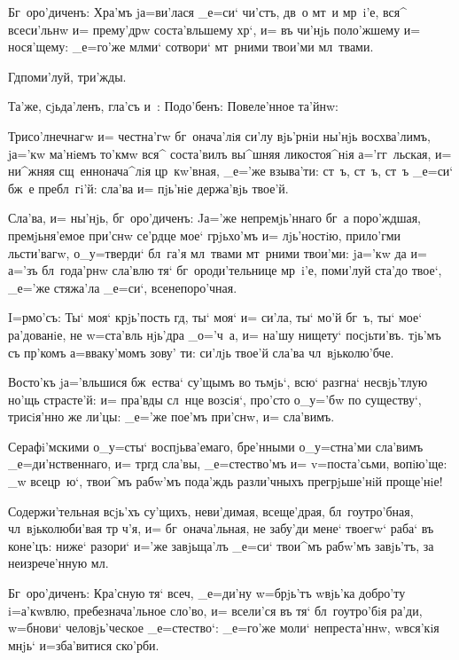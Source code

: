 Бг~оро'диченъ: Хра'мъ jа=ви'лася _е=си` чи'стъ, дв~о 
мт~и мр~i'е, вся^ всеси'льнw и= прему'дрw соста'вльшему 
хр`, и= въ чи'нjь поло'жшему и= нося'щему: _е=го'же 
мл ми` сотвори` мт~рними твои'ми мл~твами.

Гд поми'луй, три'жды.

Та'же, сjьда'ленъ, гла'съ и~: Подо'бенъ: Повеле'нное 
та'йнw:

Трисо'лнечнагw и= честна'гw бг~онача'лiя си'лу 
вjь'рнiи ны'нjь восхва'лимъ, jа='кw ма'нiемъ то'кмw вся^ 
соста'вилъ вы^шняя ликостоя^нiя а='гг~льская, и= ни^жняя 
сщ~еннонача^лiя цр~кw'вная, _е='же взыва'ти: ст~ъ, ст~ъ, 
ст~ъ _е=си` бж~е пребл~гi'й: сла'ва и= пjь'нiе держа'вjь 
твое'й.

Сла'ва, и= ны'нjь, бг~оро'диченъ: Jа='же 
непремjь'ннаго бг~а поро'ждшая, премjьня'емое при'снw 
се'рдце мое` грjьхо'мъ и= лjь'ностiю, прило'гми 
льсти'вагw, о_у=тверди` бл~га'я мл~твами мт~рними 
твои'ми: jа='кw да и= а='зъ бл~года'рнw сла'влю тя` 
бг~ороди'тельнице мр~i'е, поми'луй ста'до твое`, _е='же 
стяжа'ла _е=си`, всенепоро'чная.


I=рмо'съ: Ты` моя` крjь'пость гд, ты` моя` и= 
си'ла, ты` мо'й бг~ъ, ты` мое` ра'дованiе, не w=ста'вль 
нjь'дра _о='ч~а, и= на'шу нищету` посjьти'въ. тjь'мъ съ 
пр'комъ а=вваку'момъ зову' ти: си'лjь твое'й сла'ва 
чл~вjьколю'бче.

Восто'къ jа='вльшися бж~ества` су'щымъ во тьмjь`, всю` 
разгна` несвjь'тлую но'щь страсте'й: и= пра'вды сл~нце 
возсiя`, про'сто о_у='бw по существу`, трисiя'нно же 
ли'цы: _е='же пое'мъ при'снw, и= сла'вимъ.

Серафi'мскими о_у=сты` воспjьва'емаго, бре'нными 
о_у=стна'ми сла'вимъ _е=ди'нственнаго, и= тр гд 
сла'вы, _е=стество'мъ и= v=поста'сьми, вопiю'ще: _w 
всецр~ю`, твои^мъ рабw'мъ пода'ждь разли'чныхъ 
прегрjьше'нiй проще'нiе!

Содержи'тельная всjь'хъ су'щихъ, неви'димая, 
всеще'драя, бл~гоутро'бная, чл~вjьколюби'вая тр 
ч'я, и= бг~онача'льная, не забу'ди мене` твоегw` 
раба` въ коне'цъ: ниже` разори` и='же завjьща'лъ _е=си` 
твои^мъ рабw'мъ завjь'тъ, за неизрече'нную мл.

Бг~оро'диченъ: Кра'сную тя` всеч, _е=ди'ну 
w=брjь'тъ w\т вjь'ка добро'ту i=а'кwвлю, пребезнача'льное 
сло'во, и= всели'ся въ тя` бл~гоутро'бiя ра'ди, w=бнови` 
человjь'ческое _е=стество`: _е=го'же моли` непреста'ннw, 
w\т вся'кiя мнjь` и=зба'витися ско'рби.

